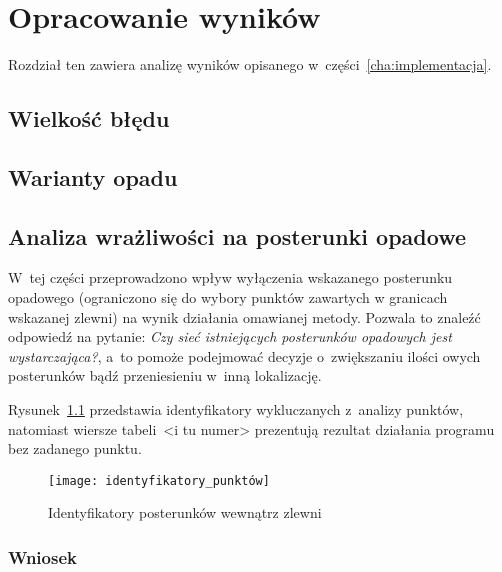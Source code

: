 \chapter{Opracowanie wyników}

Rozdział ten zawiera analizę wyników opisanego w~części~\ref{cha:implementacja}.


\section{Wielkość błędu}
\section{Warianty opadu}

\section{Analiza wrażliwości na posterunki opadowe}
W~tej części przeprowadzono wpływ wyłączenia wskazanego posterunku opadowego (ograniczono się do wybory punktów zawartych w granicach wskazanej zlewni) na wynik działania omawianej metody. Pozwala to znaleźć odpowiedź na pytanie: \textit{Czy sieć istniejących posterunków opadowych jest wystarczająca?}, a~to pomoże podejmować decyzje o~zwiększaniu ilości owych posterunków bądź przeniesieniu w~inną lokalizację.

Rysunek~\ref{fig:identyfikatory} przedstawia identyfikatory wykluczanych z~analizy punktów, natomiast wiersze tabeli~<i tu numer> prezentują rezultat działania programu bez zadanego punktu.

\begin{figure}[ht]
	\centering
	\texttt{[image: identyfikatory\_punktów]}
	\label{fig:identyfikatory}
	\caption{Identyfikatory posterunków wewnątrz zlewni}
\end{figure}

\subsection{Wniosek}